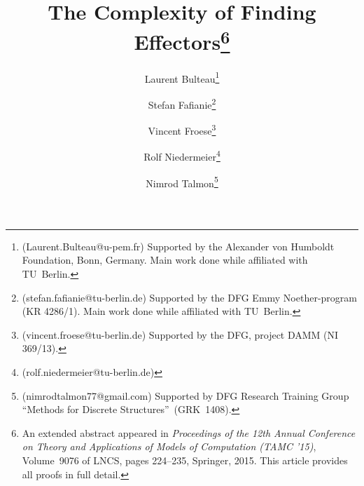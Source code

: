 \documentclass{article}
\begin{document}
\title{The Complexity of Finding Effectors\thanks{An extended
    abstract appeared in \emph{Proceedings of the 12th Annual
      Conference on Theory and Applications of Models of Computation
      (TAMC '15)}, Volume~9076 of LNCS, pages 224--235, Springer, 2015. This article provides all proofs in full detail.}}

\iffalse
\author{Laurent Bulteau\thanks{Laurent.Bulteau@u-pem.fr,IGM-LabInfo, CNRS UMR 8049, Universit\'e Paris-Est Marne-la-Vall\'ee, France.Supported by the Alexander von Humboldt Foundation, Bonn, Germany.Main work done while affiliated with  TU~Berlin.} \and Stefan Fafianie\thanks{stefan.fafianie@tu-berlin.de,Institut f\"ur Informatik, Universit\"at Bonn, Germany. Supported by the DFG Emmy Noether-program (KR 4286/1).Main work done while affiliated with TU~Berlin.}}
  \fi
  
\author{Laurent Bulteau\thanks{(Laurent.Bulteau@u-pem.fr) Supported by the Alexander von Humboldt Foundation, Bonn, Germany.
  Main work done while affiliated with  TU~Berlin.}}
  
    
\author{Stefan Fafianie\thanks{(stefan.fafianie@tu-berlin.de) Supported by the DFG Emmy Noether-program (KR 4286/1).
    Main work done while affiliated with TU~Berlin.}}


\author{Vincent Froese\thanks{(vincent.froese@tu-berlin.de) Supported by the DFG, project DAMM (NI 369/13).}}
\author{Rolf Niedermeier\thanks{(rolf.niedermeier@tu-berlin.de)}}
\author{Nimrod Talmon\thanks{(nimrodtalmon77@gmail.com) Supported by DFG Research Training Group ``Methods for Discrete Structures''~(GRK~1408).}}

  


\iffalse
\and Stefan Fafianie\thanks{Stefan
    Fafianie was supported by the DFG Emmy Noether-program (KR
    4286/1). Main work done while affiliated with TU~Berlin.}
    \and Vincent Froese\thanks{Vincent Froese was supported by the DFG, project DAMM (NI 369/13).}
    \and Rolf Niedermeier \and Nimrod Talmon\thanks{Nimrod Talmon was supported by DFG Research Training Group ``Methods for Discrete Structures''~(GRK~1408).}}


  \address{Laurent Bulteau \at
             IGM-LabInfo, CNRS UMR 8049, Universit\'e Paris-Est Marne-la-Vall\'ee, France.\\
             \email{Laurent.Bulteau@u-pem.fr}
               \and
             Stefan Fafianie \at
             Institut f\"ur Informatik,
             Universit\"at Bonn, Germany.\\
             \email{stefan.fafianie@tu-berlin.de}
               \and
             Vincent Froese, Rolf Niedermeier, and Nimrod Talmon \at
             Institut f\"ur Softwaretechnik und Theoretische Informatik,
             TU Berlin, Germany.\\
             \email{\{vincent.froese,rolf.niedermeier\}@tu-berlin.de, nimrodtalmon77@gmail.com}
           }
  \fi
  
\end{document}
